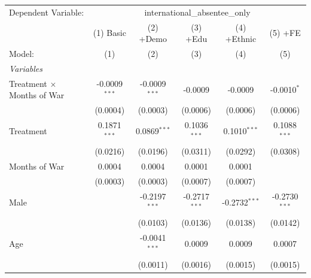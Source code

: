 
\begingroup
\centering
\begin{tabular}{lccccc}
   \tabularnewline \midrule \midrule
   Dependent Variable: & \multicolumn{5}{c}{international\_absentee\_only}\\
                                     & (1) Basic       & (2) +Demo               & (3) +Edu                       & (4) +Ethnic                    & (5) +FE \\   
   Model:                            & (1)             & (2)                     & (3)                            & (4)                            & (5)\\  
   \midrule
   \emph{Variables}\\
   Treatment $\times$ Months of War  & -0.0009$^{***}$ & -0.0009$^{***}$         & -0.0009                        & -0.0009                        & -0.0010$^{*}$\\   
                                     & (0.0004)        & (0.0003)                & (0.0006)                       & (0.0006)                       & (0.0006)\\   
   Treatment                         & 0.1871$^{***}$  & 0.0869$^{***}$          & 0.1036$^{***}$                 & 0.1010$^{***}$                 & 0.1088$^{***}$\\   
                                     & (0.0216)        & (0.0196)                & (0.0311)                       & (0.0292)                       & (0.0308)\\   
   Months of War                     & 0.0004          & 0.0004                  & 0.0001                         & 0.0001                         &   \\   
                                     & (0.0003)        & (0.0003)                & (0.0007)                       & (0.0007)                       &   \\   
   Male                              &                 & -0.2197$^{***}$         & -0.2717$^{***}$                & -0.2732$^{***}$                & -0.2730$^{***}$\\   
                                     &                 & (0.0103)                & (0.0136)                       & (0.0138)                       & (0.0142)\\   
   Age                               &                 & -0.0041$^{***}$         & 0.0009                         & 0.0009                         & 0.0007\\   
                                     &                 & (0.0011)                & (0.0016)                       & (0.0015)                       & (0.0015)\\   

\end{tabular}
